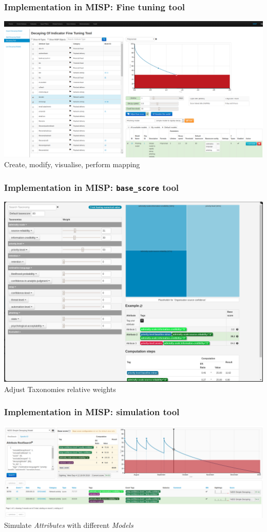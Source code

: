 \begin{frame}
    \frametitle{Implementation in MISP: Fine tuning tool}
    \includegraphics[width=1.00\linewidth]{decaying-tool.png}
    Create, modify, visualise, perform mapping
\end{frame}

\begin{frame}
    \frametitle{Implementation in MISP: \texttt{base\_score} tool}
    \includegraphics[width=1.00\linewidth]{decaying-basescore.png}
    Adjust Taxonomies relative weights
\end{frame}

\begin{frame}
    \frametitle{Implementation in MISP: simulation tool}
    \includegraphics[width=1.00\linewidth]{decaying-simulation.png}
    Simulate \textit{Attributes} with different \textit{Models}
\end{frame}

